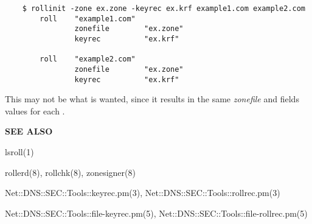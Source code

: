 \begin{verbatim}
    $ rollinit -zone ex.zone -keyrec ex.krf example1.com example2.com
        roll    "example1.com"
                zonefile        "ex.zone"
                keyrec          "ex.krf"

        roll    "example2.com"
                zonefile        "ex.zone"
                keyrec          "ex.krf"
\end{verbatim}

This may not be what is wanted, since it results in the same {\it zonefile}
and  fields values for each .

{\bf SEE ALSO}

lsroll(1)

rollerd(8),
rollchk(8),
zonesigner(8)

Net::DNS::SEC::Tools::keyrec.pm(3),
Net::DNS::SEC::Tools::rollrec.pm(3)

Net::DNS::SEC::Tools::file-keyrec.pm(5),
Net::DNS::SEC::Tools::file-rollrec.pm(5)


